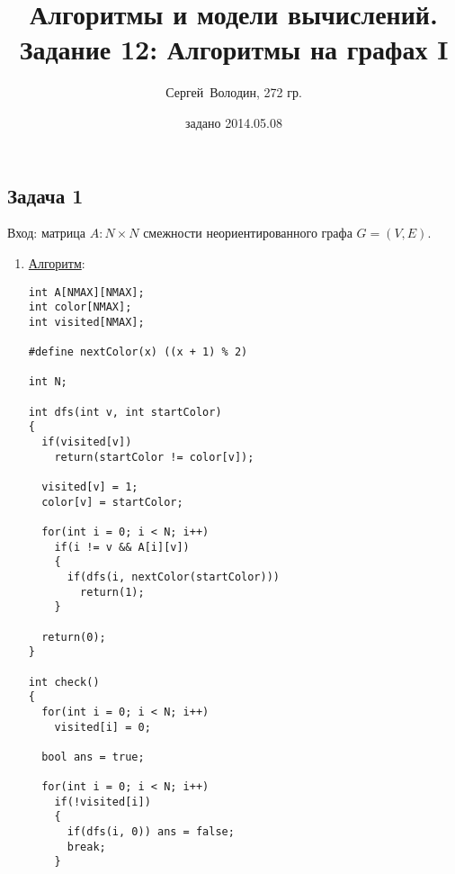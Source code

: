 \documentclass[a4paper]{article}
\date{задано 2014.05.08}
\author{Сергей~Володин, 272 гр.}
\title{Алгоритмы и модели вычислений.\\Задание 12: Алгоритмы на графах I}
\begin{document}
\maketitle
\subsection*{Задача 1}
Вход: матрица $A\colon N\times N$ смежности неориентированного графа $G=(V,E)$.
\begin{enumerate}
\item \href{https://bitbucket.org/etoestja/inf/raw/HEAD/mipt/s4/AACM/C/R1/main.cpp}{Алгоритм}:
\begin{lstlisting}
int A[NMAX][NMAX];
int color[NMAX];
int visited[NMAX];

#define nextColor(x) ((x + 1) % 2)

int N;

int dfs(int v, int startColor)
{
  if(visited[v])
    return(startColor != color[v]);

  visited[v] = 1;
  color[v] = startColor;

  for(int i = 0; i < N; i++)
    if(i != v && A[i][v])
    {
      if(dfs(i, nextColor(startColor)))
        return(1);
    }

  return(0);
}

int check()
{
  for(int i = 0; i < N; i++)
    visited[i] = 0;

  bool ans = true;

  for(int i = 0; i < N; i++)
    if(!visited[i])
    {
      if(dfs(i, 0)) ans = false;
      break;
    }


\end{lstlisting}
\end{enumerate}
\end{document}
